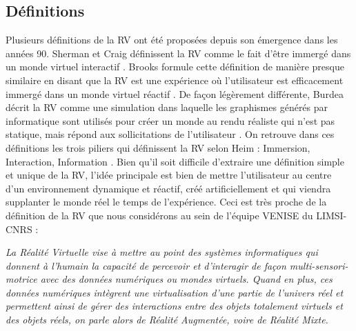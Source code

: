 \subsection{Définitions}

Plusieurs définitions de la RV ont été proposées depuis son émergence dans les années 90. Sherman et Craig définissent la RV comme le fait d'être immergé dans un monde virtuel interactif \cite{sherman2002understanding}. Brooks formule cette définition de manière presque similaire en disant que la RV est une expérience où l'utilisateur est efficacement immergé dans un monde virtuel réactif \cite{brooks1999s}. De façon légèrement différente, Burdea décrit la RV comme une simulation dans laquelle les graphismes générés par informatique sont utilisés pour créer un monde au rendu réaliste qui n'est pas statique, mais répond aux sollicitations de l'utilisateur \cite{burdea2003virtual}. On retrouve dans ces définitions les trois piliers qui définissent la RV selon Heim : Immersion, Interaction, Information \cite{heim1998virtual}. Bien qu'il soit difficile d'extraire une définition simple et unique de la RV, l'idée principale est bien de mettre l'utilisateur au centre d'un environnement dynamique et réactif, créé artificiellement et qui viendra supplanter le monde réel le temps de l'expérience. Ceci est très proche de la définition de la RV que nous considérons au sein de l'équipe VENISE du LIMSI-CNRS \cite{bourdot_patrick_reconstruction_2002}:

\textit{La Réalité Virtuelle vise à mettre au point des systèmes informatiques qui donnent à l'humain la capacité de percevoir et d’interagir de façon multi-sensori-motrice avec des données numériques ou mondes virtuels. Quand en plus, ces données numériques intègrent une virtualisation d’une partie de l’univers réel et permettent ainsi de gérer des interactions entre des objets totalement virtuels et des objets réels, on parle alors de Réalité Augmentée, voire de Réalité Mixte.
}

